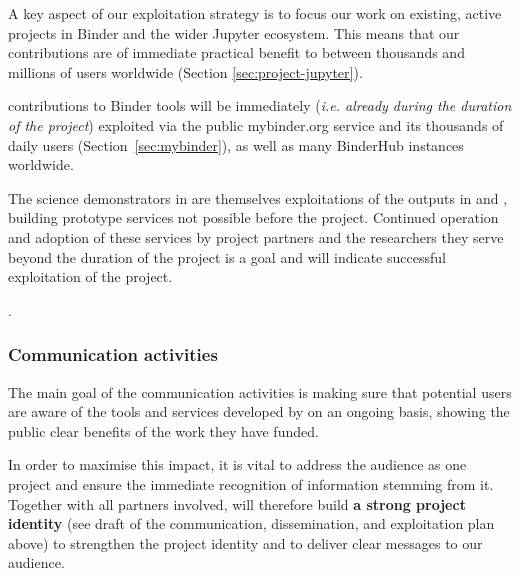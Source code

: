 A key aspect of our exploitation strategy is to focus our work on existing,
active projects in Binder and the wider Jupyter ecosystem.
This means that our contributions are of immediate practical benefit to between
thousands and millions of users worldwide (Section \ref{sec:project-jupyter}).

\TheProject contributions to Binder tools will be immediately (\emph{i.e.
  already during the duration of the project}) exploited via the public mybinder.org service
and its thousands of daily users (Section~\ref{sec:mybinder}), as well as many BinderHub instances worldwide.

The science demonstrators in  are themselves exploitations of the outputs
in  and ,
building prototype services not possible before the project.
Continued operation and adoption of these services by project partners and the researchers they serve beyond the duration of the project
is a goal and will indicate successful exploitation of the project.


.

\subsubsection{Communication activities}

The main goal of the communication activities is making sure that potential users
are aware of the tools and services developed by \TheProject
on an ongoing basis,
showing the public clear benefits of the work they have funded.

In order to maximise this impact, it is vital to address the audience as one project
and ensure the immediate recognition of information stemming from it.
Together with all partners involved, \TheProject will therefore build \textbf{a strong project identity}
(see draft of the communication, dissemination, and exploitation plan above) to strengthen the project
identity and to deliver clear messages to our audience.

